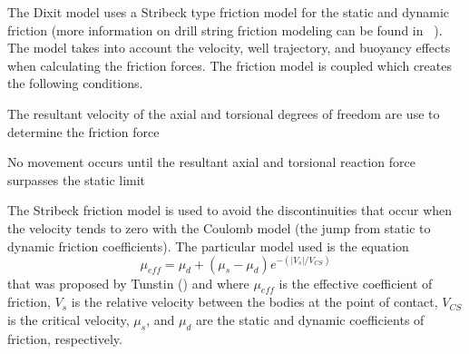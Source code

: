 The Dixit model uses a Stribeck type friction model for the static and dynamic friction (more information on drill string friction modeling can be found in ~\cite{ref:cayeux2020a}).  The model takes into account the velocity, well trajectory, and buoyancy effects when calculating the friction forces. The friction model is coupled which creates the following conditions.
\begin{bulletedlist}
    \item The resultant velocity of the axial and torsional degrees of freedom are use to determine the friction force
    \item No movement occurs until the resultant axial and torsional reaction force surpasses the static limit
\end{bulletedlist}

The Stribeck friction model is used to avoid the discontinuities that occur when the velocity tends to zero with the Coulomb model (the jump from static to dynamic friction coefficients). The particular model used is the equation
\begin{equation}
	\label{Fig:tunstinfrictionmodel}
	\mu_{eff} = \mu_{d} + (\mu_{s} - \mu_{d}) e^{-(|V_s|/V_{CS})}
\end{equation}
that was proposed by Tunstin (\cite{ref:tustin1947a}) and where $\mu_{eff}$ is the effective coefficient of friction, $V_s$ is the relative velocity between the bodies at the point of contact, $V_{CS}$ is the critical velocity, $\mu_{s}$, and $\mu_{d}$ are the static and dynamic coefficients of friction, respectively.

